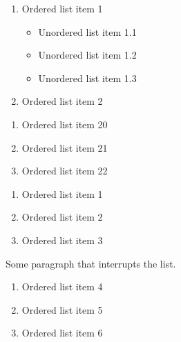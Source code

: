
\begin{enumerate}


\item Ordered list item 1



\begin{itemize}


\item Unordered list item 1.1

\item Unordered list item 1.2

\item Unordered list item 1.3


\end{itemize}
\item Ordered list item 2


\end{enumerate}




\begin{enumerate}


\item Ordered list item 20

\item Ordered list item 21

\item Ordered list item 22


\end{enumerate}




\begin{enumerate}


\item Ordered list item 1

\item Ordered list item 2

\item Ordered list item 3


\end{enumerate}



Some paragraph that interrupts the list.



\begin{enumerate}


\item Ordered list item 4

\item Ordered list item 5

\item Ordered list item 6


\end{enumerate}


